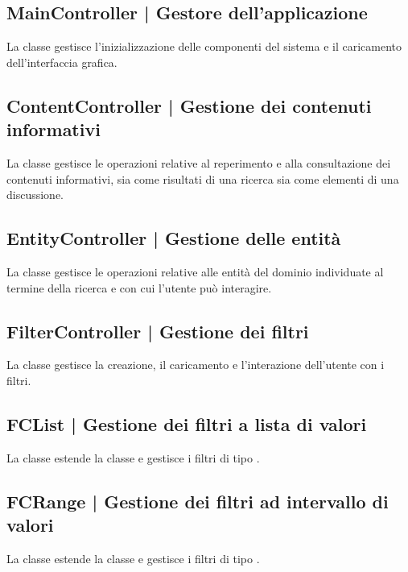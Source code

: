 \documentclass[10pt,a4paper,headinclude,footinclude,hidelinks]{scrreprt} %
\begin{document}
	\subsection[MainController]{MainController | Gestore dell'applicazione}
	\label{sec:stage:design:controller:main-controller}
	La classe \textit{} gestisce l'inizializzazione delle componenti del sistema e il caricamento dell'interfaccia grafica.

	\subsection[ContentController]{ContentController | Gestione dei contenuti informativi}
	\label{sec:stage:design:controller:content}
	La classe \textit{} gestisce le operazioni relative al reperimento e alla consultazione dei contenuti informativi, sia come risultati di una ricerca sia come elementi di una discussione.

	\subsection[EntityController]{EntityController | Gestione delle entità}
	\label{sec:stage:design:controller:entity}
	La classe \textit{} gestisce le operazioni relative alle entità del dominio individuate al termine della ricerca e con cui l'utente può interagire.

	\subsection[FilterController]{FilterController | Gestione dei filtri}
	\label{sec:stage:design:controller:filter}
	La classe \textit{} gestisce la creazione, il caricamento e l'interazione dell'utente con i filtri.

	\subsection[FCList]{FCList | Gestione dei filtri a lista di valori}
	\label{sec:stage:design:controller:filter-list}
	La classe \textit{} estende la classe \textit{} e gestisce i filtri di tipo \textit{}.

	\subsection[FCRange]{FCRange | Gestione dei filtri ad intervallo di valori}
	\label{sec:stage:design:controller:filter-range}
	La classe \textit{} estende la classe \textit{} e gestisce i filtri di tipo \textit{}.
\end{document}
